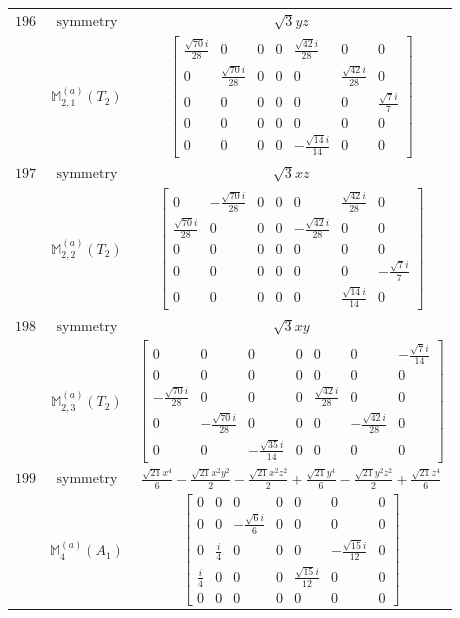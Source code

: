 \documentclass[fleqn,8pt,landscape]{jsarticle}
\begin{document}
\begin{longtable}{ccc}
$ 196 $ & $ \text{symmetry} $ & $ \sqrt{3} y z $ \\
$  $ & $ \mathbb{M}_{2,1}^{(a)}(T_{2}) $ & $ \begin{bmatrix} \frac{\sqrt{70} i}{28} & 0 & 0 & 0 & \frac{\sqrt{42} i}{28} & 0 & 0 \\ 0 & \frac{\sqrt{70} i}{28} & 0 & 0 & 0 & \frac{\sqrt{42} i}{28} & 0 \\ 0 & 0 & 0 & 0 & 0 & 0 & \frac{\sqrt{7} i}{7} \\ 0 & 0 & 0 & 0 & 0 & 0 & 0 \\ 0 & 0 & 0 & 0 & - \frac{\sqrt{14} i}{14} & 0 & 0 \end{bmatrix} $ \\ \hline
$ 197 $ & $ \text{symmetry} $ & $ \sqrt{3} x z $ \\
$  $ & $ \mathbb{M}_{2,2}^{(a)}(T_{2}) $ & $ \begin{bmatrix} 0 & - \frac{\sqrt{70} i}{28} & 0 & 0 & 0 & \frac{\sqrt{42} i}{28} & 0 \\ \frac{\sqrt{70} i}{28} & 0 & 0 & 0 & - \frac{\sqrt{42} i}{28} & 0 & 0 \\ 0 & 0 & 0 & 0 & 0 & 0 & 0 \\ 0 & 0 & 0 & 0 & 0 & 0 & - \frac{\sqrt{7} i}{7} \\ 0 & 0 & 0 & 0 & 0 & \frac{\sqrt{14} i}{14} & 0 \end{bmatrix} $ \\ \hline
$ 198 $ & $ \text{symmetry} $ & $ \sqrt{3} x y $ \\
$  $ & $ \mathbb{M}_{2,3}^{(a)}(T_{2}) $ & $ \begin{bmatrix} 0 & 0 & 0 & 0 & 0 & 0 & - \frac{\sqrt{7} i}{14} \\ 0 & 0 & 0 & 0 & 0 & 0 & 0 \\ - \frac{\sqrt{70} i}{28} & 0 & 0 & 0 & \frac{\sqrt{42} i}{28} & 0 & 0 \\ 0 & - \frac{\sqrt{70} i}{28} & 0 & 0 & 0 & - \frac{\sqrt{42} i}{28} & 0 \\ 0 & 0 & - \frac{\sqrt{35} i}{14} & 0 & 0 & 0 & 0 \end{bmatrix} $ \\ \hline
$ 199 $ & $ \text{symmetry} $ & $ \frac{\sqrt{21} x^{4}}{6} - \frac{\sqrt{21} x^{2} y^{2}}{2} - \frac{\sqrt{21} x^{2} z^{2}}{2} + \frac{\sqrt{21} y^{4}}{6} - \frac{\sqrt{21} y^{2} z^{2}}{2} + \frac{\sqrt{21} z^{4}}{6} $ \\
$  $ & $ \mathbb{M}_{4}^{(a)}(A_{1}) $ & $ \begin{bmatrix} 0 & 0 & 0 & 0 & 0 & 0 & 0 \\ 0 & 0 & - \frac{\sqrt{6} i}{6} & 0 & 0 & 0 & 0 \\ 0 & \frac{i}{4} & 0 & 0 & 0 & - \frac{\sqrt{15} i}{12} & 0 \\ \frac{i}{4} & 0 & 0 & 0 & \frac{\sqrt{15} i}{12} & 0 & 0 \\ 0 & 0 & 0 & 0 & 0 & 0 & 0 \end{bmatrix} $ \\ \hline

\end{longtable}
\end{document}
